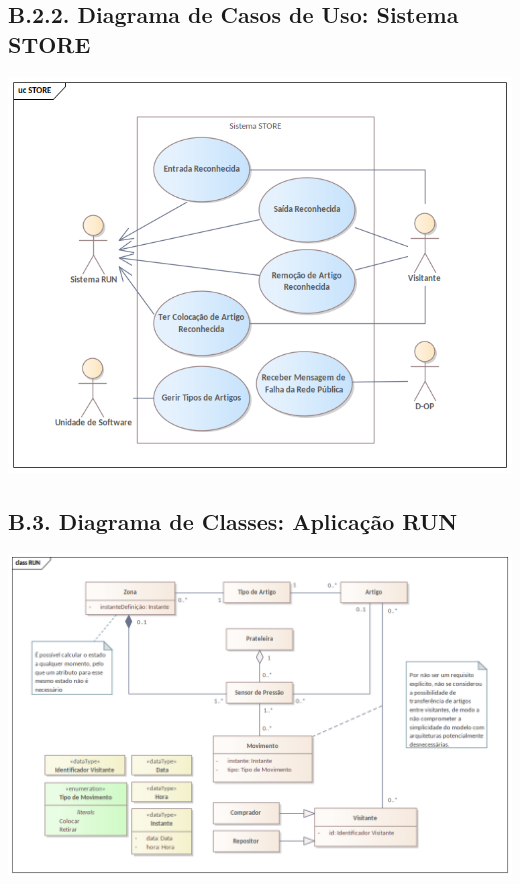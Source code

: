 \documentclass[12pt,a4paper]{article}
\begin{document}
\begin{landscape}
	\section*{B.2.2. Diagrama de Casos de Uso: Sistema STORE}
	\includegraphics[width=1.19\textwidth]{../UC_STORE.png}
\end{landscape}

\begin{landscape}
	\section*{B.3. Diagrama de Classes: Aplicação RUN}
	\includegraphics[width=1.46\textwidth]{../Class_RUN.png}
\end{landscape}
\end{document}
